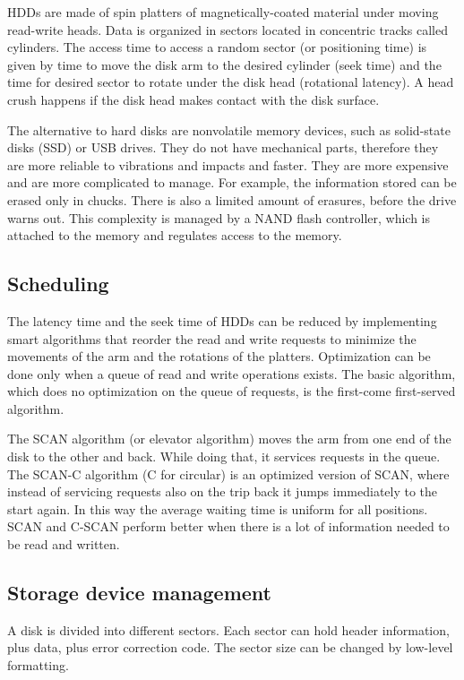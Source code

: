 HDDs are made of spin platters of magnetically-coated material under moving read-write heads. Data is organized in sectors located in concentric tracks called cylinders. The access time to access a random sector (or positioning time) is given by time to move the disk arm to the desired cylinder (seek time) and the time for desired sector to rotate under the disk head (rotational latency). A head crush happens if the disk head makes contact with the disk surface.


The alternative to hard disks are nonvolatile memory devices, such as solid-state disks (SSD) or USB drives. They do not have mechanical parts, therefore they are more reliable to vibrations and impacts and faster. They are more expensive and are more complicated to manage. For example, the information stored can be erased only in chucks. There is also a limited amount of erasures, before the drive warns out. This complexity is managed by a NAND flash controller, which is attached to the memory and regulates access to the memory.

\subsection{Scheduling}
The latency time and the seek time of HDDs can be reduced by implementing smart algorithms that reorder the read and write requests to minimize the movements of the arm and the rotations of the platters. Optimization can be done only when a queue of read and write operations exists. The basic algorithm, which does no optimization on the queue of requests, is the first-come first-served algorithm.

The SCAN algorithm (or elevator algorithm) moves the arm from one end of the disk to the other and back. While doing that, it services requests in the queue. The SCAN-C algorithm (C for circular) is an optimized version of SCAN, where instead of servicing requests also on the trip back it jumps immediately to the start again. In this way the average waiting time is uniform for all positions. SCAN and C-SCAN perform better when there is a lot of information needed to be read and written.

\subsection{Storage device management}
A disk is divided into different sectors. Each sector can hold header information, plus data, plus error correction code. The sector size can be changed by low-level formatting.


